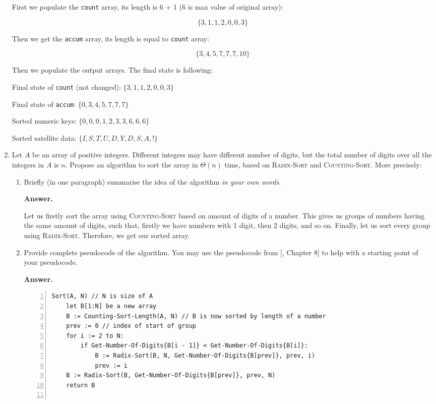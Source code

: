 \documentclass{article}
\begin{document}
\begin{enumerate}
    First we populate the \texttt{count} array, its length is 6 + 1 (6 is max value of original array):

    \[\{3, 1, 1, 2, 0, 0, 3\}\]

    Then we get the \texttt{accum} array, its length is equal to \texttt{count} array:

    \[\{3, 4, 5, 7, 7, 7, 10\}\]

    Then we populate the output arrays. The final state is following:
    \begin{center}
        Final state of \texttt{count} (not changed): $\{3, 1, 1, 2, 0, 0, 3\}$

        Final state of \texttt{accum}: $\{0, 3, 4, 5, 7, 7, 7\}$

        Sorted numeric keys: $\{0, 0, 0, 1, 2, 3, 3, 6, 6, 6\}$

        Sorted satellite data: $\{I, S, T, U, D, Y, D, S, A, !\}$
    \end{center}
    
    \item Let $A$ be an array of positive integers. Different integers may have different number of digits, but the total number of digits over all the integers in $A$ is $n$. Propose an algorithm to sort the array in $\Theta(n)$ time, based on \textsc{Radix-Sort} and \textsc{Counting-Sort}. More precisely:
    \begin{enumerate}
        \item Briefly (in one paragraph) summarise the idea of the algorithm \textit{in your own words}.

        \textbf{Answer.}

        Let us firstly sort the array using \textsc{Counting-Sort} based on amount of digits of a number. This gives us groups of numbers having the same amount of digits, such that, firstly we have numbers with 1 digit, then 2 digits, and so on. Finally, let us sort every group using \textsc{Radix-Sort}. Therefore, we get our sorted array.
        
        \item Provide complete pseudocode of the algorithm. You may use the pseudocode from [, Chapter 8] to help with a starting point of your pseudocode.

        \textbf{Answer.}

\begin{lstlisting}[numbers=left,language={},style=pseudo,mathescape=true,firstnumber=1]
Sort(A, N) // N is size of A
    let B[1:N] be a new array
    B := Counting-Sort-Length(A, N) // B is now sorted by length of a number
    prev := 0 // index of start of group
    for i := 2 to N:
        if Get-Number-Of-Digits{B[i - 1]} < Get-Number-Of-Digits{B[i]}:
            B := Radix-Sort(B, N, Get-Number-Of-Digits{B[prev]}, prev, i)
            prev := i
    B := Radix-Sort(B, Get-Number-Of-Digits{B[prev]}, prev, N)
    return B


\end{lstlisting}
\end{enumerate}
\end{enumerate}
\end{document}

